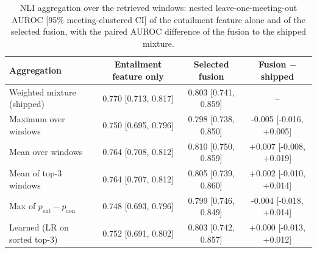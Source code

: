 \begin{table}[htbp]
\centering
\caption{NLI aggregation over the retrieved windows: nested leave-one-meeting-out AUROC [95\% meeting-clustered CI] of the entailment feature alone and of the selected fusion, with the paired AUROC difference of the fusion to the shipped mixture.}
\label{tab:aggr}
\small
\begin{tabular}{@{}lccc@{}}
\toprule
Aggregation & Entailment feature only & Selected fusion & Fusion $-$ shipped \\
\midrule
Weighted mixture (shipped) & 0.770 [0.713, 0.817] & 0.803 [0.741, 0.859] & -- \\
Maximum over windows & 0.750 [0.695, 0.796] & 0.798 [0.738, 0.850] & -0.005 [-0.016, +0.005] \\
Mean over windows & 0.764 [0.708, 0.812] & 0.810 [0.750, 0.859] & +0.007 [-0.008, +0.019] \\
Mean of top-3 windows & 0.764 [0.707, 0.812] & 0.805 [0.739, 0.860] & +0.002 [-0.010, +0.014] \\
Max of $p_{\mathrm{ent}}-p_{\mathrm{con}}$ & 0.748 [0.693, 0.796] & 0.799 [0.746, 0.849] & -0.004 [-0.018, +0.014] \\
Learned (LR on sorted top-3) & 0.752 [0.691, 0.802] & 0.803 [0.742, 0.857] & +0.000 [-0.013, +0.012] \\
\bottomrule
\end{tabular}
\end{table}